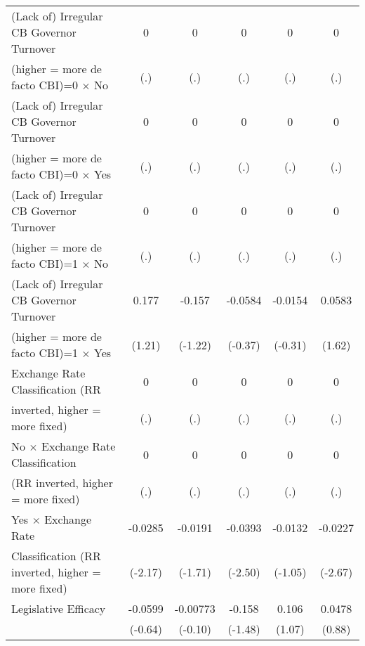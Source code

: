 {\begin{tabular}{l*{5}{c}}
\addlinespace
(Lack of) Irregular CB Governor Turnover&    0         &    0         &    0         &    0         &    0         \\
(higher = more de facto CBI)=0 $\times$ No&  (.)         &  (.)         &  (.)         &  (.)         &  (.)         \\
\addlinespace
(Lack of) Irregular CB Governor Turnover&    0         &    0         &    0         &    0         &    0         \\
(higher = more de facto CBI)=0 $\times$ Yes&  (.)         &  (.)         &  (.)         &  (.)         &  (.)         \\
\addlinespace
(Lack of) Irregular CB Governor Turnover&    0         &    0         &    0         &    0         &    0         \\
(higher = more de facto CBI)=1 $\times$ No&  (.)         &  (.)         &  (.)         &  (.)         &  (.)         \\
\addlinespace
(Lack of) Irregular CB Governor Turnover&0.177         &-0.157         &-0.0584         &-0.0154         &0.0583         \\
(higher = more de facto CBI)=1 $\times$ Yes&(1.21)         &(-1.22)         &(-0.37)         &(-0.31)         &(1.62)         \\
\addlinespace
Exchange Rate Classification (RR        &    0         &    0         &    0         &    0         &    0         \\
inverted, higher = more fixed)          &  (.)         &  (.)         &  (.)         &  (.)         &  (.)         \\
\addlinespace
No $\times$ Exchange Rate Classification&    0         &    0         &    0         &    0         &    0         \\
(RR inverted, higher = more fixed)      &  (.)         &  (.)         &  (.)         &  (.)         &  (.)         \\
\addlinespace
Yes $\times$ Exchange Rate              &-0.0285\sym{*}  &-0.0191         &-0.0393\sym{*}  &-0.0132         &-0.0227\sym{**} \\
Classification (RR inverted, higher = more fixed)&(-2.17)         &(-1.71)         &(-2.50)         &(-1.05)         &(-2.67)         \\
\addlinespace
Legislative Efficacy                    &-0.0599         &-0.00773         &-0.158         &0.106         &0.0478         \\
                                        &(-0.64)         &(-0.10)         &(-1.48)         &(1.07)         &(0.88)         \\

\end{tabular}}
